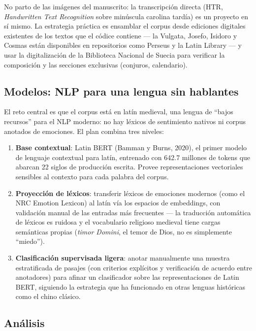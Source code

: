 \documentclass[11pt]{article}
\begin{document}
No parto de las imágenes del manuscrito: la transcripción directa (HTR, \emph{Handwritten
Text Recognition} sobre minúscula carolina tardía) es un proyecto en sí mismo. La estrategia
práctica es ensamblar el corpus desde ediciones digitales existentes de los textos que el
códice contiene --- la Vulgata, Josefo, Isidoro y Cosmas están disponibles en repositorios
como Perseus y la Latin Library --- y usar la digitalización de la Biblioteca Nacional de
Suecia para verificar la composición y las secciones exclusivas (conjuros, calendario).

\subsection{Modelos: NLP para una lengua sin hablantes}

El reto central es que el corpus está en latín medieval, una lengua de ``bajos recursos''
para el NLP moderno: no hay léxicos de sentimiento nativos ni corpus anotados de emociones.
El plan combina tres niveles:

\begin{enumerate}
  \item \textbf{Base contextual}: Latin BERT (Bamman y Burns, 2020), el primer modelo de
        lenguaje contextual para latín, entrenado con 642.7 millones de tokens que abarcan
        22 siglos de producción escrita. Provee representaciones vectoriales sensibles al
        contexto para cada palabra del corpus.
  \item \textbf{Proyección de léxicos}: transferir léxicos de emociones modernos (como el
        NRC Emotion Lexicon) al latín vía los espacios de embeddings, con validación manual
        de las entradas más frecuentes --- la traducción automática de léxicos es ruidosa y
        el vocabulario religioso medieval tiene cargas semánticas propias
        (\emph{timor Domini}, el temor de Dios, no es simplemente ``miedo'').
  \item \textbf{Clasificación supervisada ligera}: anotar manualmente una muestra
        estratificada de pasajes (con criterios explícitos y verificación de acuerdo entre
        anotadores) para afinar un clasificador sobre las representaciones de Latin BERT,
        siguiendo la estrategia que ha funcionado en otras lenguas históricas como el chino
        clásico.
\end{enumerate}

\subsection{Análisis}
\end{document}
